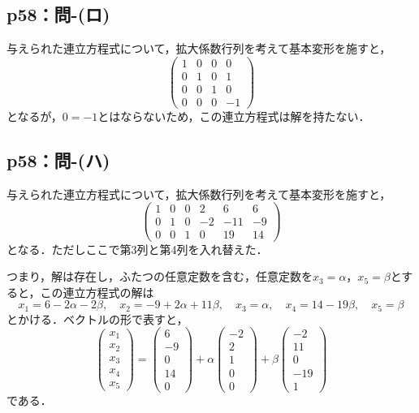 \documentclass[a4paper,10pt,fleqn]{ltjsarticle}
\begin{document}
\subsection*{p58：問-(ロ)}

\begin{tleftbar}
    与えられた連立方程式について，拡大係数行列を考えて基本変形を施すと，
    \[
        \begin{pmatrix} 1 & 0 & 0 & 0 \\ 0 & 1& 0 & 1 \\ 0 & 0 & 1 & 0 \\ 0 & 0 & 0 & -1 \end{pmatrix}
    \]
    となるが，$0 = -1$とはならないため，この連立方程式は解を持たない．
\end{tleftbar}

\subsection*{p58：問-(ハ)}

\begin{tleftbar}
    与えられた連立方程式について，拡大係数行列を考えて基本変形を施すと，
    \[
        \begin{pmatrix} 1 & 0 & 0 & 2 & 6 & 6 \\ 0 & 1& 0 & -2 & -11 & -9 \\ 0 & 0 & 1 & 0 & 19 & 14 \end{pmatrix}
    \]
    となる．ただしここで第3列と第4列を入れ替えた．

    つまり，解は存在し，ふたつの任意定数を含む，任意定数を$x_3 = \alpha$，$x_5 = \beta$とすると，この連立方程式の解は
    \[
        x_1 = 6-2\alpha -2 \beta , \quad x_2 = -9 + 2\alpha +11 \beta , \quad x_3 = \alpha , \quad x_4 = 14-19\beta,\quad x_5 =\beta
    \]
    とかける．ベクトルの形で表すと，
    \[
        \begin{pmatrix} x_1 \\ x_2 \\ x_3 \\ x_4 \\ x_5 \end{pmatrix} = \begin{pmatrix} 6 \\ -9 \\ 0 \\ 14 \\ 0 \end{pmatrix} + \alpha \begin{pmatrix} -2 \\ 2 \\ 1 \\ 0 \\ 0 \end{pmatrix} + \beta \begin{pmatrix} -2 \\ 11 \\ 0 \\ -19 \\ 1 \end{pmatrix}
    \]
    である．
\end{tleftbar}
\end{document}
